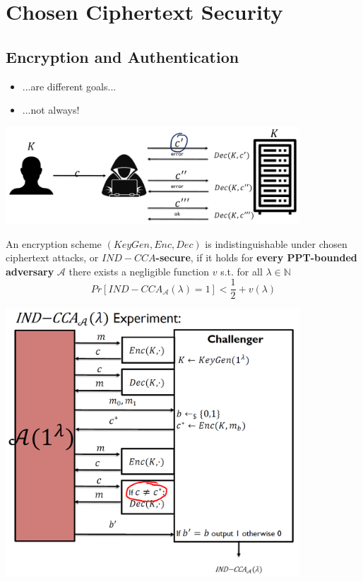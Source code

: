 

\chapter{Chosen Ciphertext Security}

\section{Encryption and Authentication}	
	\begin{itemize}
		\item ...are different goals...
		\item ...not always!
	\end{itemize}
	\begin{center}
		\includegraphics[width=110mm]{Graphics/Chosen Ciphertext Security/ccs1.png}
	\end{center}

	\begin{definition}
		An encryption scheme $(KeyGen,Enc,Dec)$ is indistinguishable under chosen ciphertext attacks, or $IND-CCA$\textbf{-secure}, 
		if it holds for \textbf{every PPT-bounded adversary} $\mathcal{A}$ there exists a negligible function $v$ s.t. for all $\lambda \in \mathbb{N}$
		$$Pr[IND-CCA_{\mathcal{A}}(\lambda) = 1] < \frac{1}{2} + v(\lambda)$$
	\end{definition}
	\begin{center}
		\includegraphics[width=110mm]{Graphics/Chosen Ciphertext Security/ccs2.png}
	\end{center}
	
